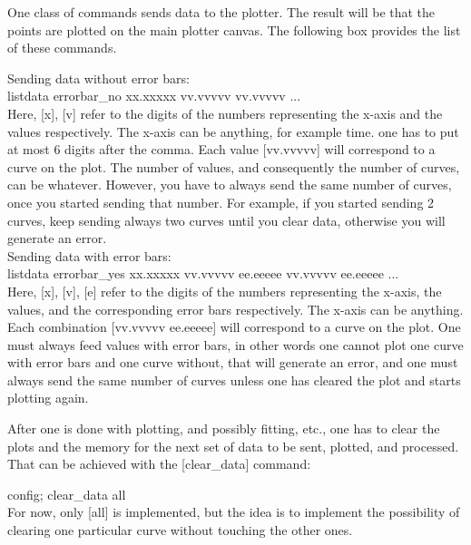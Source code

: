 \documentclass[11pt]{article} %
\begin{document}
One class of commands sends data to the plotter. The result will be that the points are plotted on the main plotter canvas. The following box provides the list of these commands.

\begin{tcolorbox}[title=Sending data point by point]

Sending data without error bars: 
\\

{\selectfont listdata errorbar\_no xx.xxxxx vv.vvvvv vv.vvvvv  $...$}
\\

Here, [x], [v] refer to the digits of the numbers representing the x-axis and the values respectively. The x-axis can be anything, for example time. one has to put at most 6 digits after the comma. Each value [vv.vvvvv] will correspond to a curve on the plot. The number of values, and consequently the number of curves, can be whatever. However, you have to always send the same number of curves, once you started sending that number. For example, if you started sending 2 curves, keep sending always two curves until you clear data, otherwise you will generate an error. 
\\

Sending data with error bars:
\\

{\selectfont listdata errorbar\_yes xx.xxxxx vv.vvvvv ee.eeeee vv.vvvvv ee.eeeee  $...$}
\\

Here, [x], [v], [e] refer to the digits of the numbers representing the x-axis, the values, and the corresponding error bars respectively. The x-axis can be anything. Each combination [vv.vvvvv ee.eeeee] will correspond to a curve on the plot. One must always feed values with error bars, in other words one cannot plot one curve with error bars and one curve without, that will generate an error, and one must always send the same number of curves unless one has cleared the plot and starts plotting again. 

\end{tcolorbox}

After one is done with plotting, and possibly fitting, etc., one has to clear the plots and the memory for the next set of data to be sent, plotted, and processed. That can be achieved with the [clear\_data] command:

\begin{tcolorbox}[title=Clearing data plot and fit results]

{\selectfont config; clear\_data all}
\\

For now, only [all] is implemented, but the idea is to implement the possibility of clearing one particular curve without touching the other ones.
\end{tcolorbox}
\end{document}
